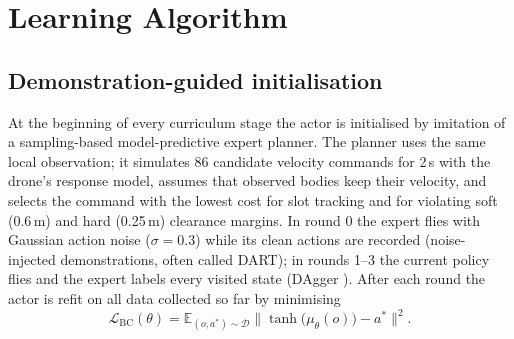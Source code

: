 \section{Learning Algorithm}
\subsection{Demonstration-guided initialisation}
At the beginning of every curriculum stage the actor is initialised by imitation of a sampling-based
model-predictive expert planner. The planner uses the same local observation; it simulates 86 candidate
velocity commands for 2\,s with the drone's response model, assumes that observed bodies keep their velocity,
and selects the command with the lowest cost for slot tracking and for violating soft (0.6\,m) and hard
(0.25\,m) clearance margins. In round 0 the expert flies with Gaussian action noise ($\sigma = 0.3$) while its
clean actions are recorded (noise-injected demonstrations, often called DART); in rounds 1--3 the current policy flies and the expert
labels every visited state (DAgger \cite{ross2011reduction}). After each round the actor is refit on all data
collected so far by minimising
\begin{equation}
  \mathcal{L}_{\mathrm{BC}}(\theta) = \mathbb{E}_{(o,a^\ast)\sim\mathcal{D}}
  \bigl\lVert \tanh\bigl(\mu_\theta(o)\bigr) - a^\ast \bigr\rVert^2 .
  \label{eq:bc}
\end{equation}

